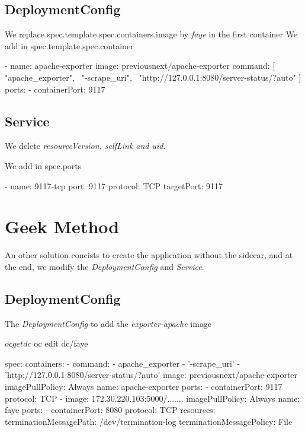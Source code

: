 \subsection{DeploymentConfig}
We replace spec.template.spec.containers.image by \emph{faye} in the first container
We add in spec.template.spec.container

\begin{bashcode}
  - name: apache-exporter
  image: previousnext/apache-exporter
  command: [ "apache_exporter", \
  "-scrape_uri", \
  "http://127.0.0.1:8080/server-status/?auto" ]
  ports:
  - containerPort: 9117
\end{bashcode}

\subsection{Service}
We delete \emph{resourceVersion, selfLink and uid}.

We add in spec.ports

\begin{bashcode}
  - name: 9117-tcp
  port: 9117
  protocol: TCP
  targetPort: 9117
\end{bashcode}

\section{Geek Method}
An other solution concists to create the application without the sidecar, and at the end, we modify the \emph{DeploymentConfig} and \emph{Service}.

\subsection{DeploymentConfig}

The \emph{DeploymentConfig} to add the \emph{exporter-apache} image
\begin{bashcode}
$ oc get dc
$ oc edit dc/faye
\end{bashcode}

\begin{yamlcode}
  spec:
    containers:
        - command:
            - apache_exporter
            - '-scrape_uri'
            - 'http://127.0.0.1:8080/server-status/?auto'
          image: previousnext/apache-exporter
          imagePullPolicy: Always
          name: apache-exporter
          ports:
            - containerPort: 9117
              protocol: TCP
        - image: 172.30.220.103:5000/.......
          imagePullPolicy: Always
          name: faye
          ports:
            - containerPort: 8080
              protocol: TCP
          resources: {}
          terminationMessagePath: /dev/termination-log
          terminationMessagePolicy: File
\end{yamlcode}

